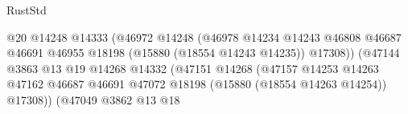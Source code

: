 \begin{lexlean}{RustStd}
\begin{coremodule}
                                                            @20
                                                            @14248
                                                            @14333
                                                            (@46972
                                                              @14248
                                                              (@46978
                                                                @14234
                                                                @14243
                                                                @46808
                                                                @46687
                                                                @46691
                                                                @46955
                                                                @18198
                                                                (@15880 (@18554 @14243 @14235))
                                                                @17308))
                                                            (@47144
                                                              @3863
                                                              @13
                                                              @19
                                                              @14268
                                                              @14332
                                                              (@47151
                                                                @14268
                                                                (@47157
                                                                  @14253
                                                                  @14263
                                                                  @47162
                                                                  @46687
                                                                  @46691
                                                                  @47072
                                                                  @18198
                                                                  (@15880 (@18554 @14263 @14254))
                                                                  @17308))
                                                              (@47049
                                                                @3862
                                                                @13
                                                                @18

\end{coremodule}
\end{lexlean}
